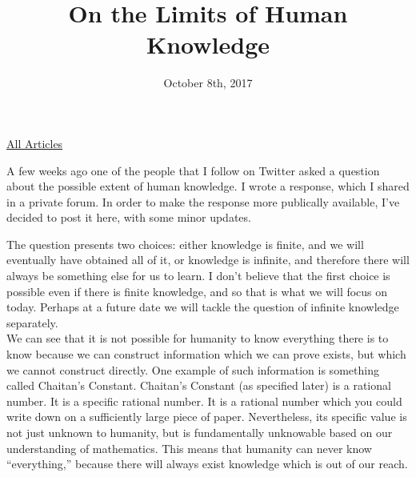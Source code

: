 \documentclass{article}
\title{On the Limits of Human Knowledge}
\date{October 8th, 2017}
\begin{document}
\maketitle
\begin{center}
  \href{../index.html}{All Articles}
\end{center}
A few weeks ago one of the people that I follow on Twitter asked a question about the possible extent of human knowledge. I wrote a response, which I shared in a private forum. In order to make the response more publically available, I've decided to post it here, with some minor updates.\\


The question presents two choices: either knowledge is finite, and we will eventually have obtained all of it, or knowledge is infinite, and therefore there will always be something else for us to learn. I don't believe that the first choice is possible even if there is finite knowledge, and so that is what we will focus on today. Perhaps at a future date we will tackle the question of infinite knowledge separately.\\

We can see that it is not possible for humanity to know everything there is to know because we can construct information which we can prove exists, but which we cannot construct directly. One example of such information is something called Chaitan's Constant. Chaitan's Constant (as specified later) is a rational number. It is a specific rational number. It is a rational number which you could write down on a sufficiently large piece of paper. Nevertheless, its specific value is not just unknown to humanity, but is fundamentally unknowable based on our understanding of mathematics. This means that humanity can never know ``everything,'' because there will always exist knowledge which is out of our reach.\\
\end{document}
